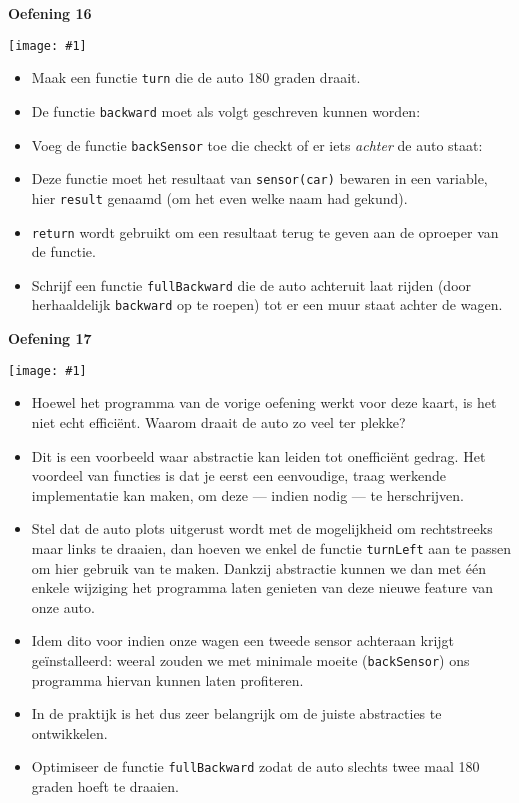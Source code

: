 \documentclass[a4paper]{article}
\newcommand{\newexercise}[1]{\clearpage\begin{center}\Huge\bf #1\end{center}}
\newcommand{\exercisemap}[1]{\begin{center}\texttt{[image: \#1]}\end{center}}
\newcommand{\code}[1]{
  \begin{center}
    \begin{minipage}{.8\linewidth}
      
    \end{minipage}
  \end{center}
}
\begin{document}
\newexercise{Oefening 16}
\exercisemap{ex16}
\begin{itemize}
  \item Maak een functie \verb'turn' die de auto 180 graden draait.
  \item De functie \verb'backward' moet als volgt geschreven kunnen worden:
        \code{backward.js}
  \item Voeg de functie \verb'backSensor' toe die checkt of er iets \emph{achter} de auto staat:
        \code{backsensor.js}
  \item Deze functie moet het resultaat van \verb'sensor(car)' bewaren in een variable,
        hier \verb'result' genaamd (om het even welke naam had gekund).
  \item \verb'return' wordt gebruikt om een resultaat terug te geven aan de oproeper van de functie.
  \item Schrijf een functie \verb'fullBackward' die de auto achteruit laat rijden
        (door herhaaldelijk \verb'backward' op te roepen) tot er een muur staat achter de wagen.
\end{itemize}


\newexercise{Oefening 17}
\exercisemap{ex17}
\begin{itemize}
  \item Hoewel het programma van de vorige oefening werkt voor deze kaart,
        is het niet echt effici\"ent. Waarom draait de auto zo veel ter plekke?
  \item Dit is een voorbeeld waar abstractie kan leiden tot oneffici\"ent gedrag.
        Het voordeel van functies is dat je eerst een eenvoudige, traag werkende implementatie kan
        maken, om deze --- indien nodig --- te herschrijven.
  \item Stel dat de auto plots uitgerust wordt met de mogelijkheid om rechtstreeks
        maar links te draaien, dan hoeven we enkel de functie \verb'turnLeft' aan te passen
        om hier gebruik van te maken. Dankzij abstractie kunnen we dan
        met \'e\'en enkele wijziging het programma laten genieten van deze nieuwe feature van onze auto.
  \item Idem dito voor indien onze wagen een tweede sensor achteraan krijgt ge\"installeerd:
        weeral zouden we met minimale moeite (\verb'backSensor') ons programma hiervan kunnen laten profiteren.
  \item In de praktijk is het dus zeer belangrijk om de juiste abstracties te ontwikkelen.
  \item Optimiseer de functie \verb'fullBackward' zodat de auto
        slechts twee maal 180 graden hoeft te draaien.
\end{itemize}
\end{document}
